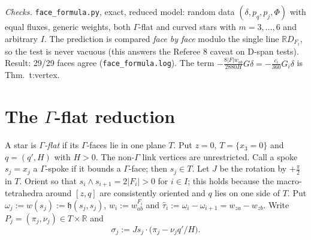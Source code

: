 \documentclass[11pt]{article}
\theoremstyle{definition}
\newcommand{\R}{\mathbb R}
\newcommand{\hh}{\mathfrak h}
\begin{document}
\emph{Checks.} \texttt{face\_formula.py}, exact, reduced model: random data $(\delta,p_q,p_j,\Phi)$ with equal fluxes, generic weights, both $\Gamma$-flat and curved stars with $m=3,\dots,6$ and arbitrary $I$. The prediction is compared \emph{face by face} modulo the single line $\R D_{F_i}$, so the test is never vacuous (this answers the Referee 8 caveat on D-span tests). Result: 29/29 faces agree (\texttt{face\_formula.log}). The term $-\frac{8|F|w_{ab}}{2880H}G\delta=-\frac{c_i}{360}G_i\delta$ is Thm.~t:vertex.

\section{The $\Gamma$-flat reduction}\label{s:flat}
A star is \emph{$\Gamma$-flat} if its $\Gamma$-faces lie in one plane $T$. Put $z=0$, $T=\{x_3=0\}$ and $q=(q',H)$ with $H>0$. The non-$\Gamma$ link vertices are unrestricted. Call a spoke $s_j=x_j$ a $\Gamma$-spoke if it bounds a $\Gamma$-face; then $s_j\in T$. Let $J$ be the rotation by $+\frac\pi2$ in $T$. Orient so that $s_i\wedge s_{i+1}=2|F_i|>0$ for $i\in I$; this holds because the macro-tetrahedra around $[z,q]$ are consistently oriented and $q$ lies on one side of $T$. Put $\omega_j:=w(s_j):=\hh(s_j,s_j)$, $w_i:=w_{ab}^{F_i}$ and $\hat\tau_i:=\omega_i-\omega_{i+1}=w_{za}-w_{zb}$. Write $P_j=(\pi_j,\nu_j)\in T\times\R$ and
\[
\sigma_j:=Js_j\cdot\bigl(\pi_j-\nu_jq'/H\bigr).
\]
\end{document}

